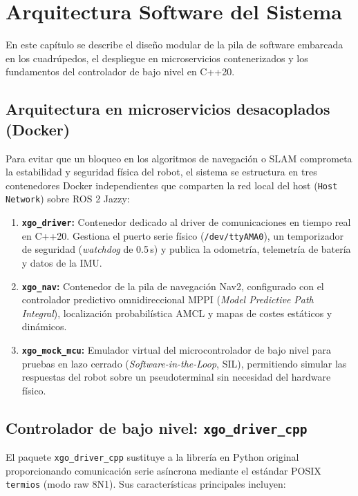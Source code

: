 \chapter{Arquitectura Software del Sistema}
\label{chap:arquitectura}

En este capítulo se describe el diseño modular de la pila de software embarcada en los cuadrúpedos, el despliegue en microservicios contenerizados y los fundamentos del controlador de bajo nivel en C++20.

\section{Arquitectura en microservicios desacoplados (Docker)}
\label{sec:docker_arch}

Para evitar que un bloqueo en los algoritmos de navegación o SLAM comprometa la estabilidad y seguridad física del robot, el sistema se estructura en tres contenedores Docker independientes que comparten la red local del host (\texttt{Host Network}) sobre ROS 2 Jazzy:

\begin{enumerate}
    \item \textbf{\texttt{xgo\_driver}:} Contenedor dedicado al driver de comunicaciones en tiempo real en C++20. Gestiona el puerto serie físico (\texttt{/dev/ttyAMA0}), un temporizador de seguridad (\textit{watchdog} de 0.5\,s) y publica la odometría, telemetría de batería y datos de la IMU.
    \item \textbf{\texttt{xgo\_nav}:} Contenedor de la pila de navegación Nav2, configurado con el controlador predictivo omnidireccional MPPI (\textit{Model Predictive Path Integral}), localización probabilística AMCL y mapas de costes estáticos y dinámicos.
    \item \textbf{\texttt{xgo\_mock\_mcu}:} Emulador virtual del microcontrolador de bajo nivel para pruebas en lazo cerrado (\textit{Software-in-the-Loop}, SIL), permitiendo simular las respuestas del robot sobre un pseudoterminal sin necesidad del hardware físico.
\end{enumerate}

\section{Controlador de bajo nivel: \texttt{xgo\_driver\_cpp}}
\label{sec:driver_cpp}

El paquete \texttt{xgo\_driver\_cpp} sustituye a la librería en Python original proporcionando comunicación serie asíncrona mediante el estándar POSIX \texttt{termios} (modo raw 8N1). Sus características principales incluyen:

